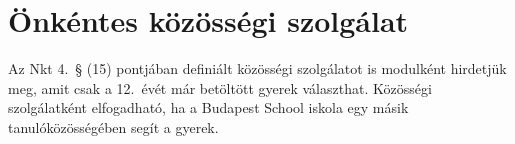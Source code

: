 \hypertarget{onkentes-kozossegi-szolgalat}{%
\section{Önkéntes közösségi
szolgálat}\label{onkentes-kozossegi-szolgalat}}

Az Nkt 4.~§ (15) pontjában definiált közösségi szolgálatot is modulként
hirdetjük meg, amit csak a 12.~évét már betöltött gyerek választhat.
Közösségi szolgálatként elfogadható, ha a Budapest School iskola egy
másik tanulóközösségében segít a gyerek.
